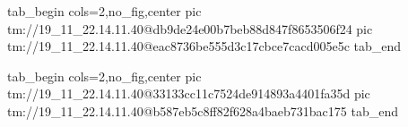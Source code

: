  
 
 
 
 

\qqSecOrig


\ifcmt
  tab_begin cols=2,no_fig,center
    pic tm://19_11_22.14.11.40@db9de24e00b7beb88d847f8653506f24
    pic tm://19_11_22.14.11.40@eac8736be555d3c17cbce7cacd005e5c
  tab_end
\fi


\ifcmt
  tab_begin cols=2,no_fig,center
    pic tm://19_11_22.14.11.40@33133cc11c7524de914893a4401fa35d
    pic tm://19_11_22.14.11.40@b587eb5c8ff82f628a4baeb731bac175
  tab_end
\fi

